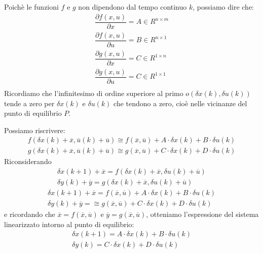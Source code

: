 \documentclass[a4paper]{report}
\begin{document}
Poich\`e le funzioni $f$ e $g$ non dipendono dal tempo continuo $k$,
possiamo dire che:
\[
\begin{array}{l}
  \dfrac{\partial f(x,u)}{\partial x} = A \in R^{n \times m}\\
  \dfrac{\partial f(x,u)}{\partial u} = B \in R^{n \times 1}\\
  \dfrac{\partial g(x,u)}{\partial x} = C \in R^{1 \times n}\\
  \dfrac{\partial g(x,u)}{\partial u} = C \in R^{1 \times 1}\\
\end{array}
\]
Ricordiamo che l'infinitesimo di ordine superiore al primo $o(\delta
x(k), \delta u(k))$ tende a zero per $\delta x(k)$ e $\delta 
u(k)$ che tendono a zero, cio\`e nelle vicinanze del punto di
equilibrio $P$.

Possiamo riscrivere:
\[
\begin{array}{l}
  f (\delta x (k) + \overline{x}, \overline{u}(k) + \overline{u})
  \cong f(\overline{x}, \overline{u}) + A \cdot \delta x(k) + B\cdot
  \delta u(k)\\
 
  g (\delta x (k) + \overline{x}, \overline{u}(k) + \overline{u})
  \cong g(\overline{x}, \overline{u}) + C \cdot \delta x(k) + D\cdot
  \delta u(k)
\end{array}
\]
Riconsiderando
\begin{equation*}
  \begin{array}{l}
    \delta x(k + 1) + \overline{x} = f ( \delta x(k) + \overline{x},
    \delta u (k) + \overline{u})\\
    \delta y (k) + \overline{y} = g (\delta x (k) + \overline{x},
    \delta u(k) + \overline{u})
  \end{array}
\end{equation*}
\begin{equation}
  \begin{array}{l}
    \delta x(k + 1) + \overline{x} = f(\overline{x}, \overline{u}) + A
    \cdot \delta x(k) + B\cdot \delta u(k) \\
    \delta y (k) + \overline{y} = \cong g(\overline{x},
    \overline{u}) + C \cdot \delta x(k) + D\cdot \delta u(k)
  \end{array}
\end{equation}
e ricordando che $\overline{x} = f(\overline{x}, \overline{u})$ e
$\overline{y} = g(\overline{x}, \overline{u})$, otteniamo
l'espressione del sistema linearizzato intorno al punto di equilibrio:
\begin{equation}
  \begin{array}{l}
    \delta x(k + 1)= A \cdot \delta x(k) + B\cdot \delta u(k) \\
    \delta y (k) = C \cdot \delta x(k) + D\cdot \delta u(k)
  \end{array}
\end{equation}
\end{document}
